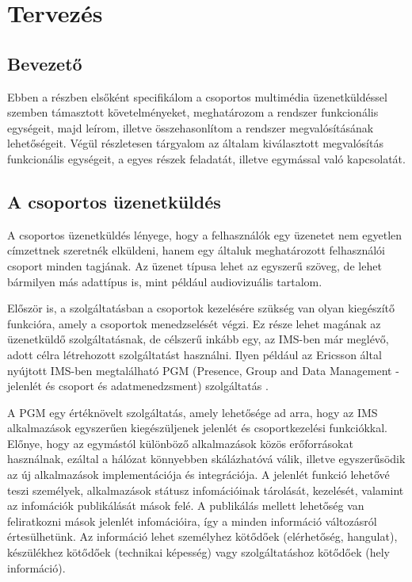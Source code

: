 \setcounter{tocdepth}{5}

\section{Tervezés}
\label{sec:tervezes}

\subsection{Bevezető}

Ebben a részben elsőként specifikálom a csoportos multimédia üzenetküldéssel szemben támasztott követelményeket, meghatározom a rendszer funkcionális egységeit, majd leírom, illetve összehasonlítom a rendszer megvalósításának lehetőségeit. Végül részletesen tárgyalom az általam kiválasztott megvalósítás funkcionális egységeit, a egyes részek feladatát, illetve egymással való kapcsolatát.

\subsection{A csoportos üzenetküldés}
\label{sec:group_messaging}

A csoportos üzenetküldés lényege, hogy a felhasználók egy üzenetet nem egyetlen címzettnek szeretnék elküldeni, hanem egy általuk meghatározott felhasználói csoport minden tagjának. Az üzenet típusa lehet az egyszerű szöveg, de lehet bármilyen más adattípus is, mint például audiovizuális tartalom. 

Először is, a szolgáltatásban a csoportok kezelésére szükség van olyan kiegészítő funkcióra, amely a csoportok menedzselését végzi. Ez része lehet magának az üzenetküldő szolgáltatásnak, de célszerű inkább egy, az IMS-ben már meglévő, adott célra létrehozott szolgáltatást használni. Ilyen például az Ericsson által nyújtott IMS-ben megtalálható PGM (Presence, Group and Data Management - jelenlét és csoport és adatmenedzsment) szolgáltatás \cite{ericsson_pgm}.

A PGM egy értéknövelt szolgáltatás, amely lehetősége ad arra, hogy az IMS alkalmazások egyszerűen kiegészüljenek jelenlét és csoportkezelési funkciókkal. Előnye, hogy az egymástól különböző alkalmazások közös erőforrásokat használnak, ezáltal a hálózat könnyebben skálázhatóvá válik, illetve egyszerűsödik az új alkalmazások implementációja és integrációja. A jelenlét funkció lehetővé teszi személyek, alkalmazások státusz infomációinak tárolását, kezelését, valamint az infomációk publikálását mások felé.
A publikálás mellett lehetőség van feliratkozni mások jelenlét infomációira, így a minden információ változásról értesülhetünk. Az információ lehet személyhez kötődőek (elérhetőség, hangulat), készülékhez kötődőek (technikai képesség) vagy szolgáltatáshoz kötődőek (hely információ).

